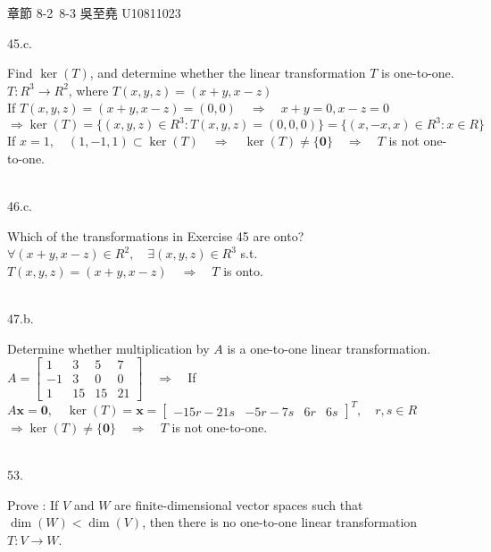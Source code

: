 \documentclass[12pt]{book}
\author{andersonwu2000}
\begin{document}
\begin{CJK}{UTF8}{bsmi}

\hfill 章節 8-2~8-3 吳至堯 U10811023


45.c. \begin{minipage}[t]{\dimexpr\linewidth-2em}
Find $\ker(T)$, and determine whether the linear transformation $T$ is one-to-one. \\
$T:R^3\rightarrow R^2$, where $T(x, y, z)=(x+y, x-z)$ \\
If $T(x, y, z)=(x+y, x-z)=(0, 0)\quad\Rightarrow\quad x+y=0, x-z=0$ \\
$\Rightarrow\ker(T)=\{(x, y, z)\in R^3:T(x, y, z)=(0, 0, 0)\}=\{(x, -x, x)\in R^3:x\in R\}$ \\
If $x=1,\quad(1, -1, 1)\subset\ker(T)\quad\Rightarrow\quad\ker(T)\ne\{\textbf{0}\}\quad\Rightarrow\quad T$ is not one-to-one.
\end{minipage}\\

46.c. \begin{minipage}[t]{\dimexpr\linewidth-2em}
Which of the transformations in Exercise 45 are onto? \\
$\forall(x+y, x-z)\in R^2,\quad\exists(x, y, z)\in R^3$ s.t. $T(x, y, z)=(x+y, x-z)\quad\Rightarrow\quad T$ is onto.
\end{minipage}\\

47.b. \begin{minipage}[t]{\dimexpr\linewidth-2em}
Determine whether multiplication by $A$ is a one-to-one linear transformation.
$A=\begin{bmatrix}
1 & 3 & 5 & 7 \\
-1 & 3 & 0 & 0 \\
1 & 15 & 15 & 21
\end{bmatrix}\quad\Rightarrow\quad$If $A\textbf{x}=\textbf{0},\quad\ker(T)=\textbf{x}=\begin{bmatrix}
-15r-21s & -5r-7s & 6r & 6s
\end{bmatrix}^T,\quad r,s\in R$ \\
$\Rightarrow\ker(T)\ne\{\textbf{0}\}\quad\Rightarrow\quad T$ is not one-to-one.
\end{minipage}\\

53. \begin{minipage}[t]{\dimexpr\linewidth-2em}
Prove : If $V$ and $W$ are finite-dimensional vector spaces such that $\dim(W)<\dim(V)$, then there is no one-to-one linear transformation $T:V\rightarrow W$.
\end{minipage}\\


\end{CJK}
\end{document}
